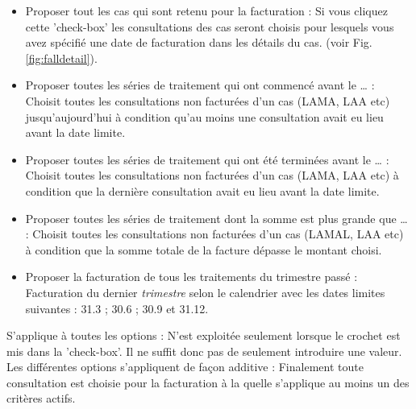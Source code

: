 \begin{itemize}
\item Proposer tout les cas qui sont retenu pour la facturation : Si vous cliquez cette 'check-box' les consultations des cas seront choisis pour lesquels vous avez spécifié une date de facturation dans les détails du cas. (voir Fig. \ref{fig:falldetail}).
\item Proposer toutes les séries de traitement qui ont commencé avant le … : Choisit toutes les consultations non facturées d'un cas (LAMA, LAA etc) jusqu'aujourd'hui à condition qu'au moins une consultation avait eu lieu avant la date limite.
\item Proposer toutes les séries de traitement qui ont été terminées avant le … : Choisit toutes les consultations non facturées d'un cas (LAMA, LAA etc) à condition que la dernière consultation avait eu lieu avant la date limite.
\item Proposer toutes les séries de traitement dont la somme est plus grande que … : Choisit toutes les consultations non facturées d'un cas (LAMAL, LAA etc) à condition que la somme totale de la facture dépasse le montant choisi.
\item Proposer la facturation de tous les traitements du trimestre passé : Facturation du dernier \textit{trimestre} selon le calendrier avec les dates limites suivantes : 31.3 ; 30.6 ; 30.9 et 31.12.
\end{itemize}
S'applique à toutes les options : N'est exploitée seulement lorsque le crochet est mis dans la 'check-box'. Il ne suffit donc pas de seulement introduire une valeur. Les différentes options s'appliquent de façon additive : Finalement toute consultation est choisie pour la facturation à la quelle s'applique au moins un des critères actifs.

\medskip

\clearpage

